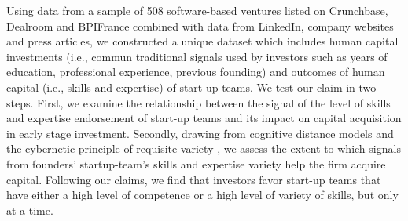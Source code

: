 \documentclass[12pt]{article}
\begin{document}
Using data from a sample of 508 software-based ventures listed on Crunchbase, Dealroom and BPIFrance combined with data from LinkedIn, company websites and press articles, we constructed a unique dataset which includes human capital investments (i.e., commun traditional signals used by investors such as years of education, professional experience, previous founding) and outcomes of human capital (i.e., skills and expertise) of start-up teams. We test our claim in two steps. First, we examine the relationship between the signal of the level of skills and expertise endorsement of start-up teams and its impact on capital acquisition in early stage investment. Secondly, drawing from cognitive distance models \citep{nooteboom2007optimal} and the cybernetic principle of requisite variety \citep{ashby1957introduction}, we assess the extent to which signals from founders’ startup-team’s skills and expertise variety help the firm acquire capital. Following our claims, we find that investors favor start-up teams that have either a high level of competence or a high level of variety of skills, but only at a time.
\end{document}
